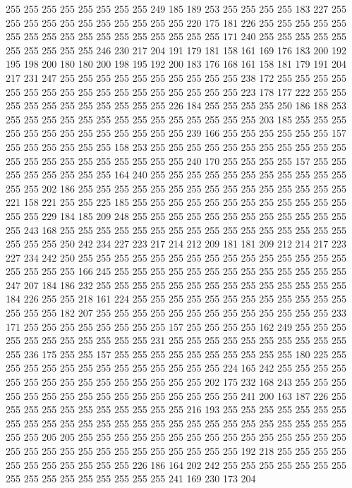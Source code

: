 255 255 255 255 255 255 255 255 249 185 189 253 255 255 255 255 183 227 255 255
255 255 255 255 255 255 255 255 255 220 175 181 226 255 255 255 255 255 255 255
255 255 255 255 255 255 255 255 255 255 171 240 255 255 255 255 255 255 255 255
255 255 246 230 217 204 191 179 181 158 161 169 176 183 200 192 195 198 200 180
180 200 198 195 192 200 183 176 168 161 158 181 179 191 204 217 231 247 255 255
255 255 255 255 255 255 255 255 238 172 255 255 255 255 255 255 255 255 255 255
255 255 255 255 255 255 255 223 178 177 222 255 255 255 255 255 255 255 255 255
255 255 226 184 255 255 255 255 250 186 188 253 255 255 255 255 255 255 255 255
255 255 255 255 255 255 203 185 255 255 255 255 255 255 255 255 255 255 255 255
255 239 166 255 255 255 255 255 255 157 255 255 255 255 255 255 158 253 255 255
255 255 255 255 255 255 255 255 255 255 255 255 255 255 255 255 255 255 255 240
170 255 255 255 255 157 255 255 255 255 255 255 255 255 164 240 255 255 255 255
255 255 255 255 255 255 255 255 255 202 186 255 255 255 255 255 255 255 255 255
255 255 255 255 255 255 221 158 221 255 255 225 185 255 255 255 255 255 255 255
255 255 255 255 255 255 255 229 184 185 209 248 255 255 255 255 255 255 255 255
255 255 255 255 255 243 168 255 255 255 255 255 255 255 255 255 255 255 255 255
255 255 255 255 255 255 250 242 234 227 223 217 214 212 209 181 181 209 212 214
217 223 227 234 242 250 255 255 255 255 255 255 255 255 255 255 255 255 255 255
255 255 255 255 255 166 245 255 255 255 255 255 255 255 255 255 255 255 255 255
247 207 184 186 232 255 255 255 255 255 255 255 255 255 255 255 255 255 255 184
226 255 255 218 161 224 255 255 255 255 255 255 255 255 255 255 255 255 255 255
255 182 207 255 255 255 255 255 255 255 255 255 255 255 255 255 233 171 255 255
255 255 255 255 255 255 157 255 255 255 255 162 249 255 255 255 255 255 255 255
255 255 255 255 231 255 255 255 255 255 255 255 255 255 255 255 236 175 255 255
157 255 255 255 255 255 255 255 255 255 255 180 225 255 255 255 255 255 255 255
255 255 255 255 255 255 224 165 242 255 255 255 255 255 255 255 255 255 255 255
255 255 255 255 202 175 232 168 243 255 255 255 255 255 255 255 255 255 255 255
255 255 255 255 255 241 200 163 187 226 255 255 255 255 255 255 255 255 255 255
255 216 193 255 255 255 255 255 255 255 255 255 255 255 255 255 255 255 255 255
255 255 255 255 255 255 255 255 255 255 255 205 205 255 255 255 255 255 255 255
255 255 255 255 255 255 255 255 255 255 255 255 255 255 255 255 255 255 255 255
255 192 218 255 255 255 255 255 255 255 255 255 255 255 226 186 164 202 242 255
255 255 255 255 255 255 255 255 255 255 255 255 255 255 255 241 169 230 173 204
